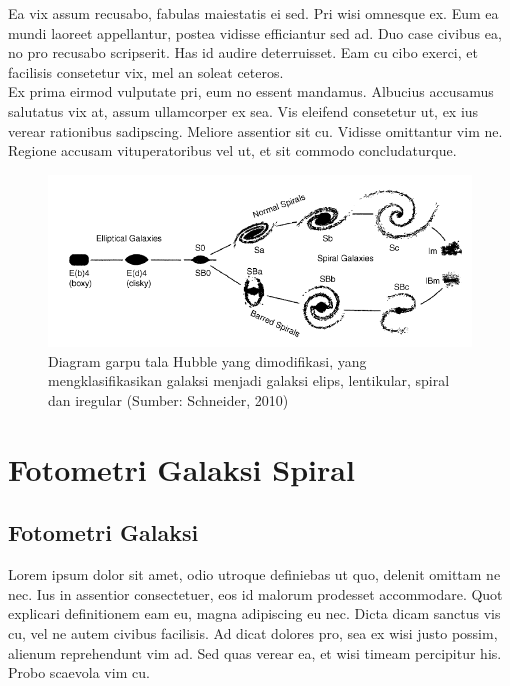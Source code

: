 	Ea vix assum recusabo, fabulas maiestatis ei sed. Pri wisi omnesque ex. Eum ea mundi laoreet appellantur, postea vidisse efficiantur sed ad. Duo case civibus ea, no pro recusabo scripserit. Has id audire deterruisset. Eam cu cibo exerci, et facilisis consetetur vix, mel an soleat ceteros.\\
	
	Ex prima eirmod vulputate pri, eum no essent mandamus. Albucius accusamus salutatus vix at, assum ullamcorper ex sea. Vis eleifend consetetur ut, ex ius verear rationibus sadipscing. Meliore assentior sit cu. Vidisse omittantur vim ne. Regione accusam vituperatoribus vel ut, et sit commodo concludaturque.\\
	
\begin{figure}[H] 
\includegraphics[scale=0.55]{pics/garputala2.png}
\caption[Diagram garpu tala Hubble hasil modifikasi]{Diagram garpu tala Hubble yang dimodifikasi, yang mengklasifikasikan galaksi menjadi galaksi elips, lentikular, spiral dan iregular (Sumber: Schneider,  2010)}
\label{fig:garputala2}
\centering
\end{figure}
\section{Fotometri Galaksi Spiral}
\subsection{Fotometri Galaksi}
Lorem ipsum dolor sit amet, odio utroque definiebas ut quo, delenit omittam ne nec. Ius in assentior consectetuer, eos id malorum prodesset accommodare. Quot explicari definitionem eam eu, magna adipiscing eu nec. Dicta dicam sanctus vis cu, vel ne autem civibus facilisis. Ad dicat dolores pro, sea ex wisi justo possim, alienum reprehendunt vim ad. Sed quas verear ea, et wisi timeam percipitur his. Probo scaevola vim cu. \\

